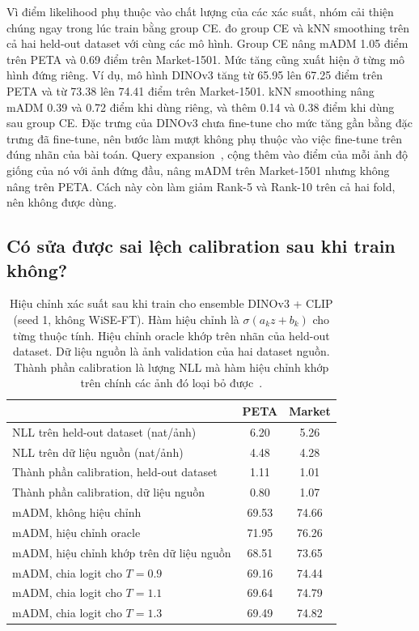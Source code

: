 \documentclass[10pt,twocolumn,letterpaper]{article}
\begin{document}
Vì điểm likelihood phụ thuộc vào chất lượng của các xác suất, nhóm cải thiện chúng ngay trong lúc train bằng group CE.  đo group CE và kNN smoothing trên cả hai held-out dataset với cùng các mô hình. Group CE nâng mADM 1.05 điểm trên PETA và 0.69 điểm trên Market-1501. Mức tăng cũng xuất hiện ở từng mô hình đứng riêng. Ví dụ, mô hình DINOv3 tăng từ 65.95 lên 67.25 điểm trên PETA và từ 73.38 lên 74.41 điểm trên Market-1501. kNN smoothing nâng mADM 0.39 và 0.72 điểm khi dùng riêng, và thêm 0.14 và 0.38 điểm khi dùng sau group CE. Đặc trưng của DINOv3 chưa fine-tune cho mức tăng gần bằng đặc trưng đã fine-tune, nên bước làm mượt không phụ thuộc vào việc fine-tune trên đúng nhãn của bài toán. Query expansion~\cite{chum07}, cộng thêm vào điểm của mỗi ảnh độ giống của nó với ảnh đứng đầu, nâng mADM trên Market-1501 nhưng không nâng trên PETA. Cách này còn làm giảm Rank-5 và Rank-10 trên cả hai fold, nên không được dùng.

\subsection{Có sửa được sai lệch calibration sau khi train không?}
\label{sec:calib}

\begin{table}[t]
\centering
\small
\setlength{\tabcolsep}{4pt}
\begin{tabular}{@{}lcc@{}}
\toprule
 & PETA & Market \\
\midrule
NLL trên held-out dataset (nat/ảnh) & 6.20 & 5.26 \\
NLL trên dữ liệu nguồn (nat/ảnh) & 4.48 & 4.28 \\
Thành phần calibration, held-out dataset & 1.11 & 1.01 \\
Thành phần calibration, dữ liệu nguồn & 0.80 & 1.07 \\
\midrule
mADM, không hiệu chỉnh & 69.53 & 74.66 \\
mADM, hiệu chỉnh oracle & 71.95 & 76.26 \\
mADM, hiệu chỉnh khớp trên dữ liệu nguồn & 68.51 & 73.65 \\
mADM, chia logit cho $T=0.9$ & 69.16 & 74.44 \\
mADM, chia logit cho $T=1.1$ & 69.64 & 74.79 \\
mADM, chia logit cho $T=1.3$ & 69.49 & 74.82 \\
\bottomrule
\end{tabular}
\caption{Hiệu chỉnh xác suất sau khi train cho ensemble DINOv3 + CLIP (seed 1, không WiSE-FT). Hàm hiệu chỉnh là $\sigma(a_kz+b_k)$ cho từng thuộc tính. Hiệu chỉnh oracle khớp trên nhãn của held-out dataset. Dữ liệu nguồn là ảnh validation của hai dataset nguồn. Thành phần calibration là lượng NLL mà hàm hiệu chỉnh khớp trên chính các ảnh đó loại bỏ được~\cite{kull}.}
\label{tab:calib}
\end{table}
\end{document}
